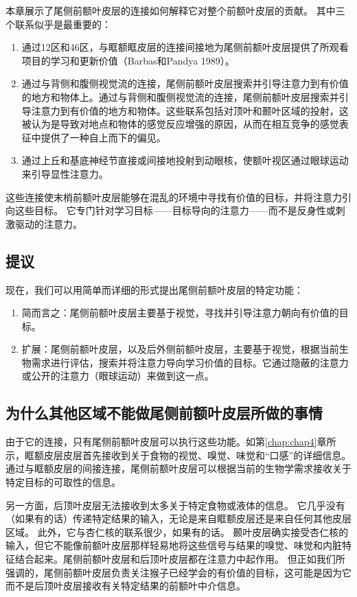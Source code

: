本章展示了尾侧前额叶皮层的连接如何解释它对整个前额叶皮层的贡献。
其中三个联系似乎是最重要的：

\begin{enumerate}
	\item 通过12区和46区，与眶额眶皮层的连接间接地为尾侧前额叶皮层提供了所观看项目的学习和更新价值（Barbas和Pandya 1989）。
	\item 通过与背侧和腹侧视觉流的连接，尾侧前额叶皮层搜索并引导注意力到有价值的地方和物体上。通过与背侧和腹侧视觉流的连接，尾侧前额叶皮层搜索并引导注意力到有价值的地方和物体。这些联系包括对顶叶和颞叶区域的投射，这被认为是导致对地点和物体的感觉反应增强的原因，从而在相互竞争的感觉表征中提供了一种自上而下的偏见。
	\item 通过上丘和基底神经节直接或间接地投射到动眼核，使额叶视区通过眼球运动来引导显性注意力。
\end{enumerate}

这些连接使末梢前额叶皮层能够在混乱的环境中寻找有价值的目标，并将注意力引向这些目标。
它专门针对学习目标——目标导向的注意力——而不是反身性或刺激驱动的注意力。



\subsection{提议}

现在，我们可以用简单而详细的形式提出尾侧前额叶皮层的特定功能：

\begin{enumerate}
	\item 简而言之：尾侧前额叶皮层主要基于视觉，寻找并引导注意力朝向有价值的目标。
	\item 扩展：尾侧前额叶皮层，以及后外侧前额叶皮层，主要基于视觉，根据当前生物需求进行评估，搜索并将注意力导向学习价值的目标。它通过隐蔽的注意力或公开的注意力（眼球运动）来做到这一点。
\end{enumerate}



\subsection{为什么其他区域不能做尾侧前额叶皮层所做的事情}

由于它的连接，只有尾侧前额叶皮层可以执行这些功能。如第\ref{chap:chap4}章所示，眶额皮层皮层首先接收到关于食物的视觉、嗅觉、味觉和“口感”的详细信息。
通过与眶额皮层的间接连接，尾侧前额叶皮层可以根据当前的生物学需求接收关于特定目标的可取性的信息。


另一方面，后顶叶皮层无法接收到太多关于特定食物或液体的信息。
它几乎没有（如果有的话）传递特定结果的输入，无论是来自眶额皮层还是来自任何其他皮层区域。
此外，它与杏仁核的联系很少，如果有的话。
颞叶皮层确实接受杏仁核的输入，但它不能像前额叶皮层那样轻易地将这些信号与结果的嗅觉、味觉和内脏特征结合起来。尾侧前额叶皮层和后顶叶皮层都在注意力中起作用。
但正如我们所强调的，尾侧前额叶皮层负责关注猴子已经学会的有价值的目标，这可能是因为它而不是后顶叶皮层接收有关特定结果的前额叶中介信息。



